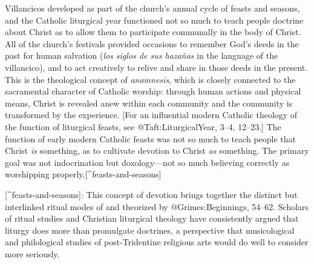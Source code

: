 Villancicos developed as part of the church's annual cycle of feasts and
seasons, and the Catholic liturgical year functioned not so much to teach people
doctrine about Christ as to allow them to participate communally in the body of
Christ.
All of the church's festivals provided occasions to remember God's deeds in the
past for human salvation (\emph{los siglos de sus hazañas} in the language of the
villancico), and to act creatively to relive and share in those deeds in the
present.
This is the theological concept of \emph{anamnesis}, which is closely connected to
the sacramental character of Catholic worship: through human actions and
physical means, Christ is revealed anew within each community and the community
is transformed by the experience.
[For an influential modern Catholic theology of the function of liturgical
feasts, see @Taft:LiturgicalYear, 3--4, 12--23.]
The function of early modern Catholic feasts was not so much to teach people
that Christ \emph{is} something, as to cultivate devotion to Christ \emph{as} something.
The primary goal was not indocrination but doxology---not so much believing
correctly as worshipping properly.[^feasts-and-seasons]

[^feasts-and-seasons]:
This concept of devotion brings together the distinct but interlinked ritual
modes of  and  theorized by @Grimes:Beginnings, 54--62.
Scholars of ritual studies and Christian liturgical theology have consistently
argued that liturgy does more than promulgate doctrines, a perspective that
musicological and philological studies of post-Tridentine religious arts would
do well to consider more seriously.


